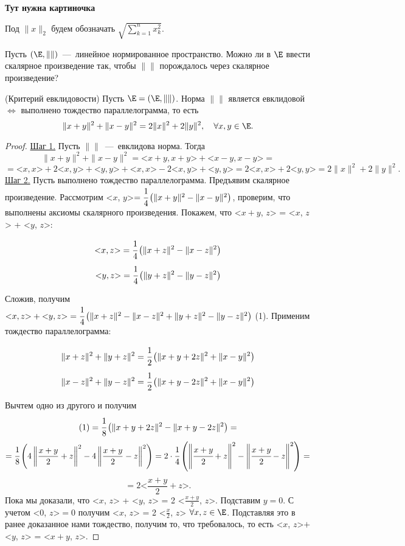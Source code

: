 \textbf{Тут нужна картиночка}
\begin{definition}
    Под $\| x\|_2$ будем обозначать $\displaystyle \sqrt{\sum_{k = 1}^{n} x_{k}^2}$.
\end{definition}
\begin{problem}
    Пусть $(\E, \| \|)$~---~линейное нормированное пространство. Можно ли в $\E$ ввести скалярное произведение так, чтобы $\| \|$ порождалось через скалярное произведение?
\end{problem}
\begin{theorem}
    (Критерий евклидовости) Пусть $\E = (\E, \| \|)$. Норма $\| \|$ является евклидовой $\Leftrightarrow$ выполнено тождество параллелограмма, то есть
    $$ \| x + y\|^2 + \| x - y\|^2 = 2\| x\|^2 + 2\| y\|^2,\quad \forall x, y \in \E.$$
\end{theorem}
\begin{proof}
    \underline{Шаг 1.} Пусть $\| \|$~---~евклидова норма. Тогда
    $$ \| x + y\|^2 + \| x - y\|^2 = \text{<}x + y, x + y\text{>} + \text{<}x - y, x - y\text{>} = $$    
    $$ = \text{<}x, x\text{>} + 2\text{<}x, y\text{>} + \text{<}y, y\text{>} + \text{<}x, x\text{>} - 2\text{<}x, y\text{>} + \text{<}y, y\text{>} = 2 \text{<}x, x\text{>} + 2 \text{<}y, y\text{>} = 2 \| x\|^2 + 2 \| y\|^2.$$
    \underline{Шаг 2.} Пусть выполнено тождество параллелограмма. Предъявим скалярное произведение. Рассмотрим <$x$, $y$>$ = \cfrac{1}{4} \left( \| x + y\|^2 - \| x - y\|^2\right)$, проверим, что выполнены аксиомы скалярного произведения. Покажем, что <$x + y$, $z$> = <$x$, $z$> + <$y$, $z$>:

    $$\text{<}x, z\text{>} = \cfrac{1}{4} \left( \| x + z\|^2 - \| x - z\|^2\right)$$
    $$\text{<}y, z\text{>} = \cfrac{1}{4} \left( \| y + z\|^2 - \| y - z\|^2\right)$$

    Сложив, получим $\text{<}x, z\text{>} + \text{<}y, z\text{>} = \cfrac{1}{4} \left( \| x + z\|^2 - \| x - z\|^2 + \| y + z\|^2 - \| y - z\|^2\right)$ (1). Применим тождество параллелограмма:
    
    $$ \| x + z\|^2 + \| y + z\|^2 = \cfrac{1}{2} \left( \|x + y + 2z\|^2 + \| x - y\|^2\right)$$
    $$ \| x - z\|^2 + \| y - z\|^2 = \cfrac{1}{2} \left( \|x + y - 2z\|^2 + \| x - y\|^2\right)$$

    Вычтем одно из другого и получим
    $$(1) = \cfrac{1}{8} \left( \|x + y + 2z\|^2 - \| x + y - 2z\|^2\right) = $$
    $$ =\cfrac{1}{8} \left( 4 \left\| \frac{x + y}{2} + z\right\|^2 - 4 \left\| \frac{x + y}{2} - z\right\|^2\right) = 2 \cdot \cfrac{1}{4} \left( \left\|\cfrac{x + y}{2} + z \right\|^2 - \left\|\cfrac{x + y}{2} - z\right\|^2\right) = $$
    $$ = 2 \text{<}\frac{x + y}{2} + z\text{>}.$$
    Пока мы доказали, что <$x$, $z$> + <$y$, $z$> = 2 <$\frac{x + y}{2}$, $z$>. Подставим $y = 0$. С учетом <$0$, $z$>$ = 0$ получим <$x$, $z$> = 2 <$\frac{x}{2}$, $z$> $\forall x, z \in \E$. Подставляя это в ранее доказанное нами тождество, получим то, что требовалось, то есть <$x$, $z$>$ + $<$y$, $z$> = <$x + y$, $z$>.


\end{proof}
